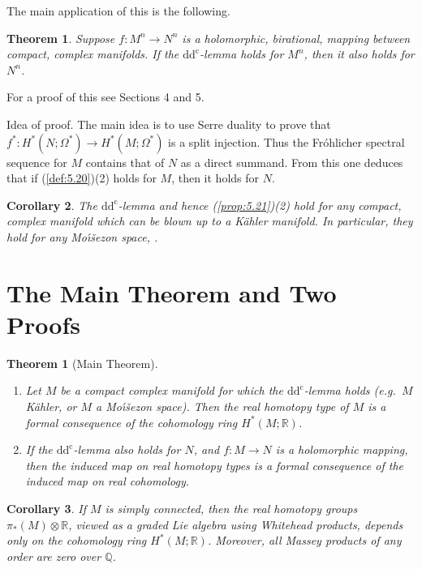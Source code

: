 \documentclass[11pt]{amsart}
\theoremstyle{plain}
\newtheorem{theorem}{Theorem}[section]
\newtheorem{corollary}[theorem]{Corollary}
\newtheorem*{theorem*}{Theorem}
\theoremstyle{definition}
\newcommand{\dd}{\mathrm{d}}
\newcommand{\dc}{\mathrm{d}^{\mathrm{c}}}
\newcommand{\RR}{\mathbb{R}}
\newcommand{\QQ}{\mathbb{Q}}
\begin{document}
The main application of this is the following.

\begin{theorem}\label{thm:5.22}
Suppose $f \colon M^{n} \to N^{n}$ is a holomorphic, birational, mapping between compact, complex manifolds. If the $\dd\dc$-lemma holds for $M^{n}$, then it also holds for $N^{n}$.
\end{theorem}

For a proof of this see \cite{D3} Sections 4 and 5.

Idea of proof. The main idea is to use Serre duality to prove that $f^{*} \colon H^{*}(N; \Omega^{*}) \to H^{*}(M; \Omega^{*})$ is a split injection. Thus the Fr\'{o}hlicher spectral sequence for $M$ contains that of $N$ as a direct summand. From this one deduces that if (\ref{def:5.20})(2) holds for $M$, then it holds for $N$.

\begin{corollary}\label{cor:5.23}
The $\dd\dc$-lemma and hence (\ref{prop:5.21})(2) hold for any compact, complex manifold which can be blown up to a K\"ahler manifold. In particular, they hold for any Mo\'{\i}\v{s}ezon space, \cite{Moi}.
\end{corollary}


\section{The Main Theorem and Two Proofs}

\begin{theorem*}[Main Theorem]%
\begin{enumerate}
\item[(i)] Let $M$ be a compact complex manifold for which the $\dd\dc$-lemma holds (e.g.\ $M$ K\"ahler, or $M$ a Mo\'{\i}\v{s}ezon space). Then the real homotopy type of $M$ is a formal consequence of the cohomology ring $H^{*}(M; \RR)$.
\item[(ii)] If the $\dd\dc$-lemma also holds for $N$, and $f \colon M \to N$ is a holomorphic mapping, then the induced map on real homotopy types is a formal consequence of the induced map on real cohomology.
\end{enumerate}
\end{theorem*}

\begin{corollary}
If $M$ is simply connected, then the real homotopy groups $\pi_{*}(M) \otimes \RR$, viewed as a graded Lie algebra using Whitehead products, depends only on the cohomology ring $H^{*}(M; \RR)$. Moreover, all Massey products of any order are zero over $\QQ$.
\end{corollary}
\end{document}
